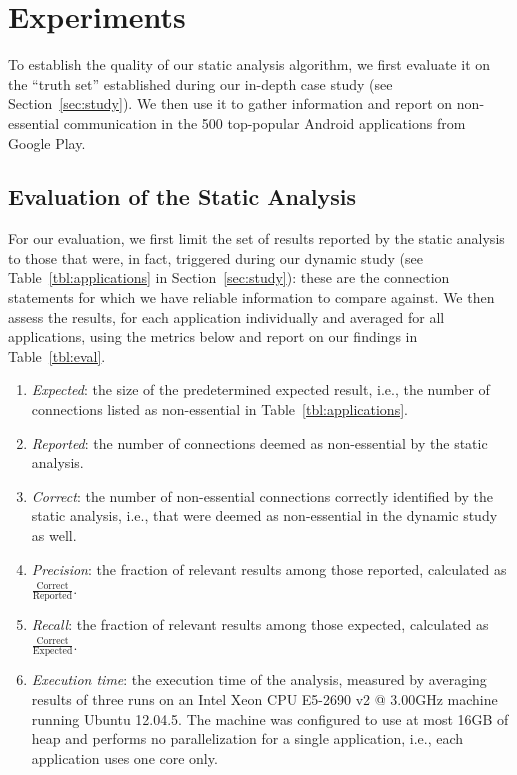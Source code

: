 \section{Experiments}
\label{sec:evaluation}
To establish the quality of our static analysis algorithm, we first evaluate it on the ``truth set'' established during our in-depth case study (see Section~\ref{sec:study}). We then use it to gather information and report on non-essential communication in the 500 top-popular Android applications from Google Play.

\subsection{Evaluation of the Static Analysis}
For our evaluation, we first limit the set of results reported by the static analysis to those that were, in fact,
 triggered during our dynamic study (see Table~\ref{tbl:applications} in Section~\ref{sec:study}): these are the connection statements for which we have reliable information to compare against. 
We then assess the results, for each application individually and averaged for all applications, using the metrics below and report on our findings in Table~\ref{tbl:eval}.

\begin{enumerate}\setlength{\itemsep}{-0.05in}
\item
\emph{Expected}: the size of the predetermined expected result, i.e., the number of connections listed as non-essential in Table~\ref{tbl:applications}.
\item
\emph{Reported}: the number of connections deemed as non-essential by the static analysis. 
\item
 \emph{Correct}: the number of non-essential connections correctly identified by the static analysis, i.e., that were deemed as non-essential in the dynamic study as well.
\item
\emph{Precision}: the fraction of relevant results among those reported,
 calculated as \emph{$\frac{\text{Correct}}{\text{Reported}}$}. 
\item
\emph{Recall}: the fraction of relevant results among those expected, calculated as
\emph{$\frac{\text{Correct}}{\text{Expected}}$}.
\item \emph{Execution time}: the execution time of the analysis, measured by averaging results of
three runs on an Intel\textsuperscript{\textregistered} Xeon\textsuperscript{\textregistered} CPU E5-2690 v2 @ 3.00GHz machine running Ubuntu 12.04.5. The machine was configured to use at most 16GB of heap and performs no parallelization for a single application, i.e., each application uses one core only.
\end{enumerate}
  

